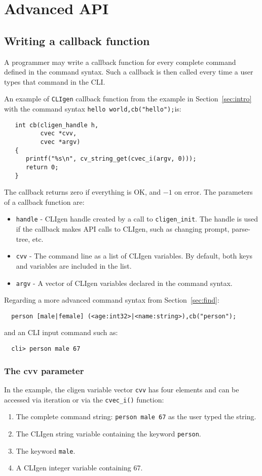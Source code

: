 \documentclass[a4paper, 10pt] {article}
\begin{document}
\section{Advanced API}

\subsection{Writing a callback function}

A programmer may write a callback function for every complete command
defined in the command syntax. Such a callback is then called every
time a user types that command in the CLI.

An example of {\tt CLIgen} callback function from the example in
Section~\ref{sec:intro} with the command syntax {\tt hello world,cb("hello");}is:

\begin{verbatim}
   int cb(cligen_handle h, 
          cvec *cvv, 
          cvec *argv)
   {
      printf("%s\n", cv_string_get(cvec_i(argv, 0)));
      return 0;
   }
\end{verbatim}
The callback returns zero if everything is OK, and $-1$ on error. The parameters of a callback function are:
\begin{itemize}
\item
{\tt handle} - CLIgen handle created by a call to {\tt cligen\_init}. The handle is used if the callback makes API calls to CLIgen, such as changing prompt, parse-tree, etc.
\item
{\tt cvv} - The command line as a list of CLIgen variables. By default, both keys and variables are included in the list.
\item
{\tt argv} - A vector of CLIgen variables declared in the command syntax.
\end{itemize}

Regarding a more advanced command syntax from Section~\ref{sec:find}:
\begin{verbatim}
  person [male|female] (<age:int32>|<name:string>),cb("person");
\end{verbatim}
and an CLI input command such as:
\begin{verbatim}
  cli> person male 67
\end{verbatim}

\subsubsection{The cvv parameter}

In the example, the cligen variable vector {\tt cvv} has four elements and can be accessed via iteration or via the {\tt cvec\_i()} function:
\begin{enumerate}
\item The complete command string: {\tt person male 67} as the user typed the string.
\item The CLIgen string variable containing the keyword {\tt person}.
\item The keyword {\tt male}.
\item A CLIgen integer variable containing 67.
\end{enumerate}
\end{document}
